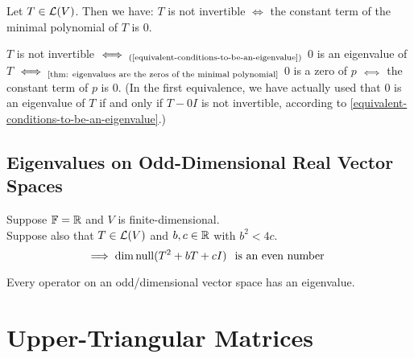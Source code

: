 \begin{thm} 
  Let $T \in \mathcal{L} (V)$. Then we have: $T$ is not invertible $\iff$ the constant term of the minimal polynomial of $T$ is $0$.
\end{thm}
\begin{prf}
  $T$ is not invertible $\iff_{\text{(\ref{equivalent-conditions-to-be-an-eigenvalue})}}$ $0$ is an eigenvalue of $T$ $\iff_{\text{\ref{thm: eigenvalues are the zeros of the minimal polynomial}}}$ $0$ is a zero of $p$ $\mathsmaller{\iff}$ the constant term of $p$ is $0$.
  (In the first equivalence, we have actually used that $0$ is an eigenvalue of $T$ if and only if $T-0I$ is not invertible, according to \ref{equivalent-conditions-to-be-an-eigenvalue}.)
\end{prf}

\subsection{Eigenvalues on Odd-Dimensional Real Vector Spaces}
\begin{thm}
  Suppose $\mathbb{F} = \mathbb{R}$ and $V$ is finite-dimensional. \\
  Suppose also that $T \in \mathcal{L} (V)$ and $b,c \in \mathbb{R}$ with $b^2 < 4c$. 
  \begin{equation}
    \implies \dim \operatorname{null} (T^2 +bT +cI) \;\;\, \text{is an even number}\;\;
  \end{equation}
\end{thm}

\begin{thm}
  Every operator on an odd\-/dimensional vector space has an eigenvalue.
\end{thm}

\section{Upper-Triangular Matrices}


